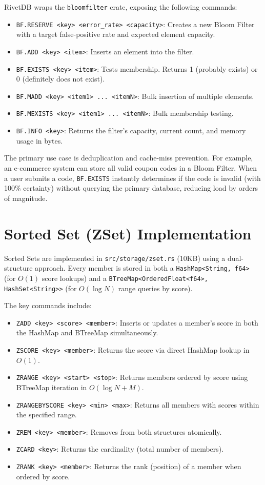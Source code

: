 RivetDB wraps the \texttt{bloomfilter} crate, exposing the following commands:
\begin{itemize}[leftmargin=2.5em]
    \item \texttt{BF.RESERVE <key> <error\_rate> <capacity>}: Creates a new Bloom Filter with a target false-positive rate and expected element capacity.
    \item \texttt{BF.ADD <key> <item>}: Inserts an element into the filter.
    \item \texttt{BF.EXISTS <key> <item>}: Tests membership. Returns 1 (probably exists) or 0 (definitely does not exist).
    \item \texttt{BF.MADD <key> <item1> ... <itemN>}: Bulk insertion of multiple elements.
    \item \texttt{BF.MEXISTS <key> <item1> ... <itemN>}: Bulk membership testing.
    \item \texttt{BF.INFO <key>}: Returns the filter's capacity, current count, and memory usage in bytes.
\end{itemize}

The primary use case is deduplication and cache-miss prevention. For example, an e-commerce system can store all valid coupon codes in a Bloom Filter. When a user submits a code, \texttt{BF.EXISTS} instantly determines if the code is invalid (with 100\% certainty) without querying the primary database, reducing load by orders of magnitude.

\section{Sorted Set (ZSet) Implementation}

Sorted Sets are implemented in \texttt{src/storage/zset.rs} (10KB) using a dual-structure approach. Every member is stored in both a \texttt{HashMap<String, f64>} (for $O(1)$ score lookups) and a \texttt{BTreeMap<OrderedFloat<f64>, HashSet<String>>} (for $O(\log N)$ range queries by score).

The key commands include:
\begin{itemize}[leftmargin=2.5em]
    \item \texttt{ZADD <key> <score> <member>}: Inserts or updates a member's score in both the HashMap and BTreeMap simultaneously.
    \item \texttt{ZSCORE <key> <member>}: Returns the score via direct HashMap lookup in $O(1)$.
    \item \texttt{ZRANGE <key> <start> <stop>}: Returns members ordered by score using BTreeMap iteration in $O(\log N + M)$.
    \item \texttt{ZRANGEBYSCORE <key> <min> <max>}: Returns all members with scores within the specified range.
    \item \texttt{ZREM <key> <member>}: Removes from both structures atomically.
    \item \texttt{ZCARD <key>}: Returns the cardinality (total number of members).
    \item \texttt{ZRANK <key> <member>}: Returns the rank (position) of a member when ordered by score.
\end{itemize}


